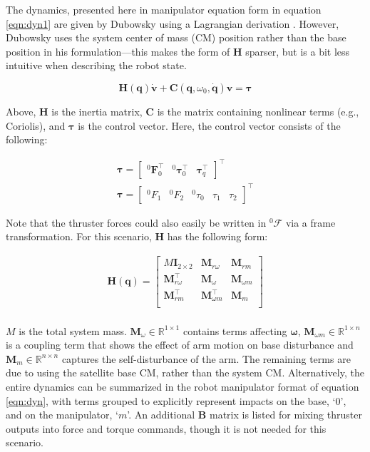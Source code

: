 \documentclass[letterpaper, 10 pt, conference]{ieeeconf}  %
\begin{document}
The dynamics, presented here in manipulator equation form in equation \ref{eqn:dyn1} are given by Dubowsky using a Lagrangian derivation \cite{Dubowsky1993}. However, Dubowsky uses the system center of mass (CM) position rather than the base position in his formulation---this makes the form of $\mathbf{H}$ sparser, but is a bit less intuitive when describing the robot state.

\begin{equation}
\label{eqn:dyn1}
	\mathbf{H}(\mathbf{q})\dot{\mathbf{v}} + \mathbf{C}(\mathbf{q}, \omega_0, \dot{\mathbf{q}})\mathbf{v} = \bm{\tau}
\end{equation}

Above, $\mathbf{H}$ is the inertia matrix, $\mathbf{C}$ is the matrix containing nonlinear terms (e.g., Coriolis), and $\bm{\tau}$ is the control vector. Here, the control vector consists of the following:

\begin{align}
	\bm{\tau} = \begin{bmatrix} ^0\mathbf{F}_0^\top & ^0\bm{\tau}_0^\top & \bm{\tau}_q^\top \end{bmatrix}^\top \\
	\bm{\tau} = \begin{bmatrix} ^0F_1 & ^0F_2 & ^0\tau_0 & \tau_1 & \tau_2 \end{bmatrix}^\top
\end{align}

Note that the thruster forces could also easily be written in $^0\mathcal{F}$ via a frame transformation. For this scenario, $\mathbf{H}$ has the following form:

\begin{align}
\mathbf{H}(\mathbf{q})  = \begin{bmatrix} M \mathbf{I}_{2 \times 2} & \mathbf{M}_{r \omega} & \mathbf{M}_{r m} \\
\mathbf{M}_{r \omega}^\top & \mathbf{M}_{\omega} & \mathbf{M}_{\omega m} \\
\mathbf{M}_{r m}^\top &  \mathbf{M}_{\omega m}^\top & \mathbf{M}^{}_{m}\\
\end{bmatrix}\\
\end{align}


$M$ is the total system mass. $\mathbf{M}_{\omega} \in \mathbb{R}^{1 \times 1}$ contains terms affecting $\bm{\omega}$, $\mathbf{M}_{\omega m} \in \mathbb{R}^{1 \times n}$ is a coupling term that shows the effect of arm motion on base disturbance and $\mathbf{M}^{}_{m} \in \mathbb{R}^{n \times n}$ captures the self-disturbance of the arm. The remaining terms are due to using the satellite base CM, rather than the system CM. Alternatively, the entire dynamics can be summarized in the robot manipulator format of equation \ref{eqn:dyn}, with terms grouped to explicitly represent impacts on the base, `$0$', and on the manipulator, `$m$'. An additional $\mathbf{B}$ matrix is listed for mixing thruster outputs into force and torque commands, though it is not needed for this scenario.
\end{document}
